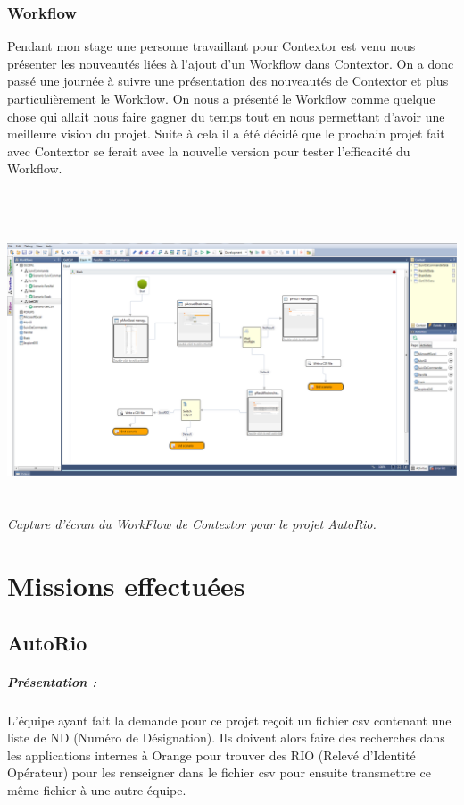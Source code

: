 \documentclass[a4paper,twoside,12pt]{report}
\begin{document}
\subsection{Workflow}
Pendant mon stage une personne travaillant pour Contextor est venu nous présenter les nouveautés liées à l'ajout d'un Workflow dans Contextor. On a donc passé une journée à suivre une présentation des nouveautés de Contextor et plus particulièrement le Workflow. On nous a présenté le Workflow comme quelque chose qui allait nous faire gagner du temps tout en nous permettant d'avoir une meilleure vision du projet. Suite à cela il a été décidé que le prochain projet fait avec Contextor se ferait avec la nouvelle version pour tester l'efficacité du Workflow.
\\\\
\begin{center}
\includegraphics[height=9cm]{workflow2_thibault.PNG}\\
\itshape Capture d'écran du WorkFlow de Contextor pour le projet AutoRio.
\end{center}
\chapter{Missions effectuées}
\section{AutoRio}
\vspace{1cm}
\paragraph {Présentation :}
L'équipe ayant fait la demande pour ce projet reçoit un fichier csv contenant une liste de ND (Numéro de Désignation). Ils doivent alors faire des recherches dans les applications internes à Orange pour trouver des RIO (Relevé d'Identité Opérateur) pour les renseigner dans le fichier csv pour ensuite transmettre ce même fichier à une autre équipe.
\end{document}
